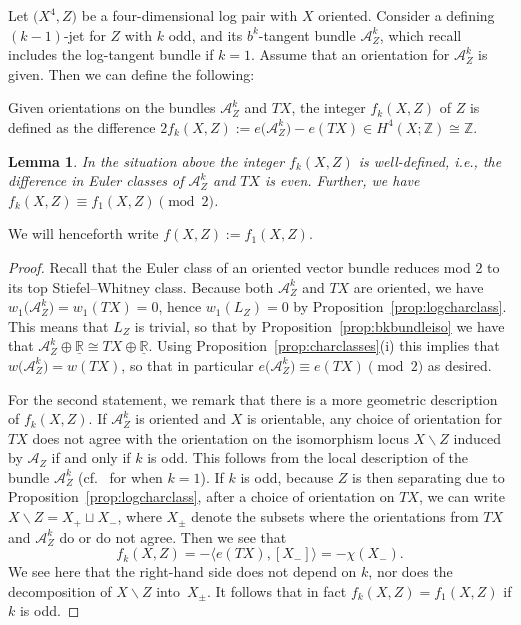 \documentclass[pdftex]{sigma}
\numberwithin{equation}{section}
\newtheorem{Lemma}[Theorem]{Lemma}
\begin{document}
Let $\big(X^4,Z\big)$ be a four-dimensional log pair with $X$ oriented. Consider a defining $(k-1)$-jet for $Z$ with $k$ odd, and its $b^k$-tangent bundle $\mathcal{A}_Z^k$, which recall includes the log-tangent bundle if $k = 1$. Assume that an orientation for $\mathcal{A}_Z^k$ is given. Then we can define the following:

\begin{Definition}\label{defn:discrepancy} Given orientations on the bundles $\mathcal{A}_Z^k$ and $TX$, the integer $f_k(X,Z)$ of $Z$ is defined as the difference $2 f_k(X,Z) := e\big(\mathcal{A}_Z^k\big) - e(TX) \in H^4(X;\mathbb{Z}) \cong \mathbb{Z}$.
\end{Definition}

\begin{Lemma}\label{lem:kdiscrepancy} In the situation above the integer $f_k(X,Z)$ is well-defined, i.e., the difference in Euler classes of $\mathcal{A}_Z^k$ and $TX$ is even. Further, we have $f_k(X,Z) \equiv f_1(X,Z) \pmod{2}$.
\end{Lemma}

We will henceforth write $f(X,Z) := f_1(X,Z)$.

\begin{proof} Recall that the Euler class of an oriented vector bundle reduces mod $2$ to its top Stiefel--Whitney class. Because both $\mathcal{A}_Z^k$ and $TX$ are oriented, we have $w_1\big(\mathcal{A}_Z^k\big) = w_1(TX) = 0$, hence $w_1(L_Z) = 0$ by Proposition~\ref{prop:logcharclass}. This means that $L_Z$ is trivial, so that by Proposition~\ref{prop:bkbundleiso} we have that $\mathcal{A}_Z^k \oplus \underline{\mathbb{R}} \cong TX \oplus \underline{\mathbb{R}}$. Using Proposition~\ref{prop:charclasses}(i) this implies that $w\big(\mathcal{A}_Z^k\big) = w(TX)$, so that in particular $e\big(\mathcal{A}_Z^k\big) \equiv e(TX) \pmod{2}$ as desired.

For the second statement, we remark that there is a more geometric description of $f_k(X,Z)$. If $\mathcal{A}^k_Z$ is oriented and $X$ is orientable, any choice of orientation for $TX$ does not agree with the orientation on the isomorphism locus $X \backslash Z$ induced by $\mathcal{A}_Z$ if and only if $k$ is odd. This follows from the local description of the bundle $\mathcal{A}_Z^k$ (cf.\ \cite{CavalcantiKlaasse19} for when $k = 1$). If $k$ is odd, because $Z$ is then separating due to Proposition~\ref{prop:logcharclass}, after a choice of orientation on $TX$, we can write $X \backslash Z = X_+ \sqcup X_-$, where $X_\pm$ denote the subsets where the orientations from $TX$ and $\mathcal{A}_Z^k$ do or do not agree. Then we see that
\begin{displaymath}
	f_k(X,Z) = - \langle e(TX), [X_-] \rangle = - \chi(X_-).
\end{displaymath}
We see here that the right-hand side does not depend on $k$, nor does the decomposition of $X\backslash Z$ into~$X_\pm$. It follows that in fact $f_k(X,Z) = f_1(X,Z)$ if $k$ is odd.
\end{proof}
\end{document}
